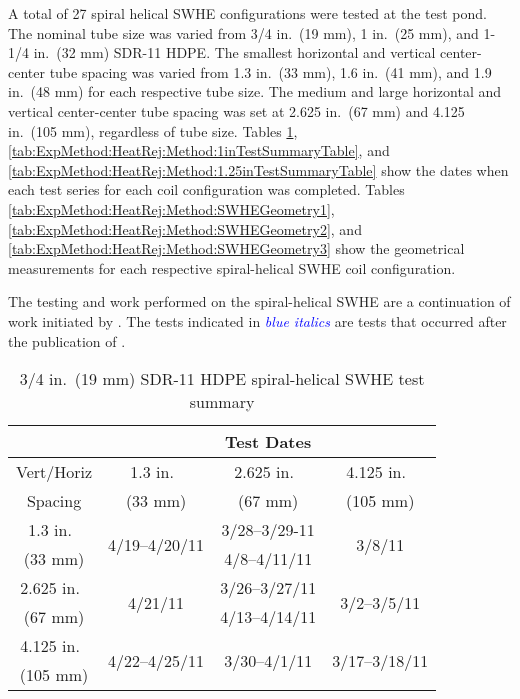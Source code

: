 A total of 27 spiral helical SWHE configurations were tested at the test pond. The nominal tube size was varied from 3/4 in.\ (19 mm), 1 in.\ (25 mm), and 1-1/4 in.\ (32 mm) SDR-11 HDPE. The smallest horizontal and vertical center-center tube spacing was varied from 1.3 in.\ (33 mm), 1.6 in.\ (41 mm), and 1.9 in.\ (48 mm) for each respective tube size. The medium and large horizontal and vertical center-center tube spacing was set at 2.625 in.\ (67 mm) and 4.125 in.\ (105 mm), regardless of tube size. Tables \ref{tab:ExpMethod:HeatRej:Method:0.75inTestSummaryTable}, \ref{tab:ExpMethod:HeatRej:Method:1inTestSummaryTable}, and  \ref{tab:ExpMethod:HeatRej:Method:1.25inTestSummaryTable} show the dates when each test series for each coil configuration was completed. Tables \ref{tab:ExpMethod:HeatRej:Method:SWHEGeometry1}, \ref{tab:ExpMethod:HeatRej:Method:SWHEGeometry2}, and \ref{tab:ExpMethod:HeatRej:Method:SWHEGeometry3} show the geometrical measurements for each respective spiral-helical SWHE coil configuration.

The testing and work performed on the spiral-helical SWHE are a continuation of work initiated by \cite{Hansen2011}. The tests indicated in \textit{\textcolor{blue}{blue italics}} are tests that occurred after the publication of \cite{Hansen2011}.

	\begin{table}
		\centering
		\caption[3/4 in.\ (19 mm) SWHE test summary]{3/4 in.\ (19 mm) SDR-11 HDPE spiral-helical SWHE test summary}
		\label{tab:ExpMethod:HeatRej:Method:0.75inTestSummaryTable}
		\begin{tabular}{|c|c|c|c|}
			\hline
			& \multicolumn{3}{|c|}{Test Dates} \\
			\hline\hline
			Vert/Horiz & 1.3 in.\ & 2.625 in.\ & 4.125 in.\ \\
			Spacing & (33 mm) & (67 mm) & (105 mm) \\
			\hline
			1.3 in.\ & \multirow{2}{*}{4/19--4/20/11} & 3/28--3/29-11 & \multirow{2}{*}{3/8/11} \\
			(33 mm) & & 4/8--4/11/11 & \\
			\hline
			2.625 in.\ & \multirow{2}{*}{4/21/11} & 3/26--3/27/11 & \multirow{2}{*}{3/2--3/5/11} \\
			(67 mm) & & 4/13--4/14/11 & \\
			\hline
			4.125 in.\ & \multirow{2}{*}{4/22--4/25/11} & \multirow{2}{*}{3/30--4/1/11} & \multirow{2}{*}{3/17--3/18/11} \\
			(105 mm) & & & \\
			\hline
		\end{tabular}
	\end{table}

